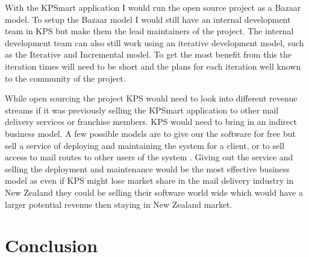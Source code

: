 \documentclass{style/CRPITStyle}
\renewcommand{\cite}{\citep}
\begin{document}
\vspace{0.1in}

With the KPSmart application I would run the open source project as a Bazaar model.
To setup the Bazaar model I would still have an internal development team in KPS
but make them the lead maintainers of the project. The internal development team
can also still work using an iterative development model, such as the Iterative and
Incremental model. To get the most benefit from this the iteration times will
need to be short and the plans for each iteration well known to the community of
the project.

\vspace{0.1in}

While open sourcing the project KPS would need to look into different revenue
streams if it was previously selling the KPSmart application to other mail delivery
services or franchise members. KPS would need to bring in an indirect business
model. A few possible models are to give our the software for free but sell a
service of deploying and maintaining the system for a client, or to sell access
to mail routes to other users of the system \cite{raymond:1999:magic}. Giving out the service and selling
the deployment and maintenance would be the most effective business model as
even if KPS might lose market share in the mail delivery industry in New Zealand
they could be selling their software world wide which would have a larger
potential revenue then staying in New Zealand market.

\section{Conclusion}



\end{document}

